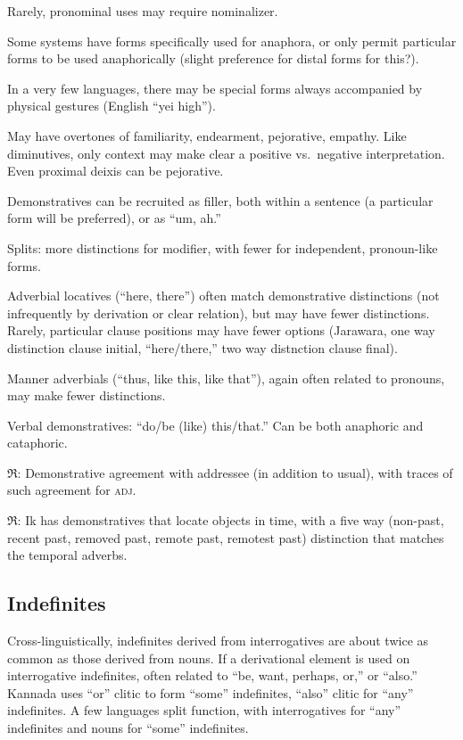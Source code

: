 \documentclass[11pt]{article}
\newcommand{\I}[1]{\textsc{#1}}   %
\newcommand{\rara}[1]{$\mathfrak{R}$: #1}
\begin{document}
Rarely, pronominal uses may require nominalizer.

Some systems have forms specifically used for anaphora, or only permit
particular forms to be used anaphorically (slight preference for
distal forms for this?).

In a very few languages, there may be special forms always accompanied
by physical gestures (English ``yei high'').

May have overtones of familiarity, endearment, pejorative,
empathy.  Like diminutives, only context may make clear a positive
vs.\ negative interpretation.  Even proximal deixis can be
pejorative. 

Demonstratives can be recruited as filler, both within a sentence (a
particular form will be preferred), or as ``um, ah.''

Splits: more distinctions for modifier, with fewer for independent,
pronoun-like forms. 

Adverbial locatives (``here, there'') often match demonstrative
distinctions (not infrequently by derivation or clear relation), but
may have fewer distinctions.  Rarely, particular clause positions may
have fewer options (Jarawara, one way distinction clause initial,
``here/there,'' two way distnction clause final).

Manner adverbials (``thus, like this, like that''), again often
related to pronouns, may make fewer distinctions.

Verbal demonstratives: ``do/be (like) this/that.'' Can be both
anaphoric and cataphoric.

\rara{Demonstrative agreement with addressee (in addition to usual),
  with traces of such agreement for \I{adj}.}

\rara{Ik has demonstratives that locate objects in time, with a
five way (non-past, recent past, removed past, remote past, remotest
past) distinction that matches the temporal adverbs.}


\subsection{Indefinites}
Cross-linguistically, indefinites derived from interrogatives are about
twice as common as those derived from nouns. If a derivational element
is used on interrogative indefinites, often related to ``be, want,
perhaps, or,'' or ``also.''  Kannada uses ``or'' clitic to form
``some'' indefinites, ``also'' clitic for ``any'' indefinites.  A few
languages split function, with interrogatives for ``any'' indefinites
and nouns for ``some'' indefinites.
\end{document}
